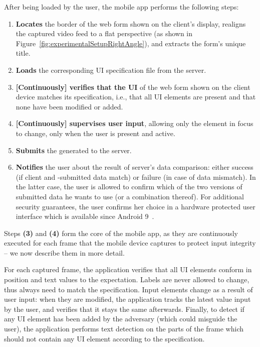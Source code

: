 After being loaded by the user, the \sysname mobile app performs the following steps:
\begin{enumerate}%
    \item \textbf{Locates} the border of the web form shown on the client's display, realigns the captured video feed to a flat perspective (as shown in Figure~\ref{fig:experimentalSetupRightAngle}), and extracts the form's unique title.
    \item \textbf{Loads} the corresponding UI specification file from the server.
    \item \textbf{[Continuously] verifies that the UI} of the web form shown on the client device matches its specification, i.e., that all UI elements are present and that none have been modified or added.
    \item \textbf{[Continuously] supervises user input}, allowing only the element in focus to change, only when the user is present and active.
	\item \textbf{Submits} the generated \POI to the server.
    \item \textbf{Notifies} the user about the result of server's data comparison: either success (if client and \md -submitted data match) or failure (in case of data mismatch).
    In the latter case, the user is allowed to confirm which of the two versions of submitted data he wants to use (or a combination thereof).
    For additional security guarantees, the user confirms her choice in a hardware protected user interface which is available since Android 9~\cite{androidConfirmation}.
\end{enumerate}

Steps \textbf{(3)} and \textbf{(4)} form the core of the \name mobile app, as they are continuously executed for each frame that the mobile device captures to protect input integrity -- we now describe them in more detail.


For each captured frame, the application verifies that all UI elements conform in position and text values to the expectation.
Labels are never allowed to change, thus always need to match the specification.
Input elements change as a result of user input: when they are modified, the application tracks the latest value input by the user, and verifies that it stays the same afterwards.
Finally, to detect if any UI element has been added by the adversary (which could misguide the user), the application performs text detection on the parts of the frame which should not contain any UI element according to the specification.

